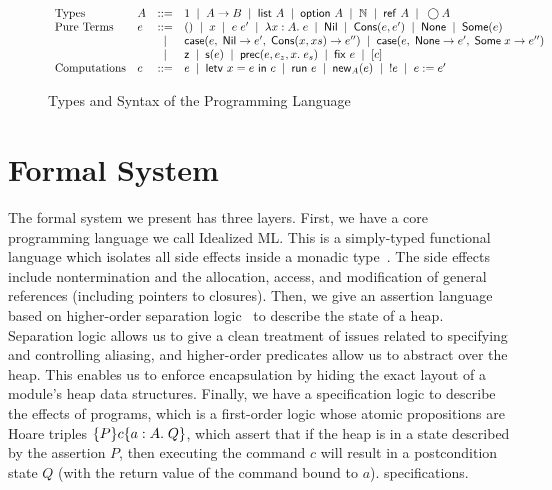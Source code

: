 \documentclass[preprint,natbib]{sigplanconf}
\begin{document}
\begin{figure*}
\renewcommand{\baselinestretch}{0.9}
\begin{displaymath}
\begin{array}{llcl}  
\mbox{Types} & A & ::= & 1 \;\;|\;\; A \to B \;\;|\;\; \mbox{\textsf{{list }}}{A} \;\;|\;\; \mbox{\textsf{{option }}}{A} \;\;|\;\;  \mathbb{N} \;\;|\;\; \mbox{\textsf{{ref }}}A \;\;|\;\; \bigcirc{A}\\ 

\mbox{Pure Terms} 
& e & ::= & () \;\;|\;\; x \;\;|\;\; e\;e' \;\;|\;\; \lambda x:A.\;e \;\;|\;\;
            \mbox{\textsf{{Nil}}} \;\;|\;\; \mbox{\textsf{{Cons}}}(e,e') \;\;|\;\; 
            \mbox{\textsf{{None}}} \;\;|\;\; \mbox{\textsf{{Some}}}(e) \\
&   & |   & \mbox{\textsf{{case}}}(e,\;\mbox{\textsf{{Nil}}} \to {e'},\; \mbox{\textsf{{Cons}}}({x},{xs}) \to {e''}) \;\;|\;\;
            \mbox{\textsf{{case}}}(e,\; \mbox{\textsf{{None}}} \to {e'},\; \mbox{\textsf{{Some}}}\;{x} \to {e''})\\ 
&   & |   & \mbox{\textsf{{z}}} \;\;|\;\; \mbox{\textsf{{s}}}(e) \;\;|\;\; \mbox{\textsf{{prec}}}(e, {e_z}, x.\; {e_s}) \;\;|\;\;
            \mbox{\textsf{{fix}}}_{}\;{e} \;\;|\;\; [c] \\
\mbox{Computations} 
& c & ::= & e \;\;|\;\; \mbox{\textsf{{letv }}}x = e\mbox{\textsf{{ in }}}c \;\;|\;\; \mbox{\textsf{{run }}}{e}  \;\;|\;\;
            \mbox{\textsf{{new}}}_{A} (e)\;\;|\;\; !e \;\;|\;\; e := e' \\
\end{array}
\end{displaymath}
\caption{Types and Syntax of the Programming Language}
\label{lang-syntax}
\renewcommand{\baselinestretch}{0.95}
\end{figure*}

\section{Formal System}

The formal system we present has three layers. First, we have a core
programming language we call Idealized ML. This is a simply-typed
functional language which isolates all side effects inside a monadic
type~\cite{pfenning-davies}. The side effects include nontermination
and the allocation, access, and modification of general references
(including pointers to closures).  Then, we give an assertion language
based on higher-order separation logic~\cite{hosl} to describe the
state of a heap. Separation logic allows us to give a clean treatment
of issues related to specifying and controlling aliasing, and
higher-order predicates allow us to abstract over the heap. This
enables us to enforce encapsulation by hiding the exact layout of a
module's heap data structures.  Finally, we have a specification logic
to describe the effects of programs, which is a first-order logic
whose atomic propositions are Hoare triples $\{{P}\}{c}\{{a:A}.\;{Q}\}$,
which assert that if the heap is in a state described by the assertion
$P$, then executing the command $c$ will result in a postcondition
state $Q$ (with the return value of the command bound to $a$).
specifications.
\end{document}
